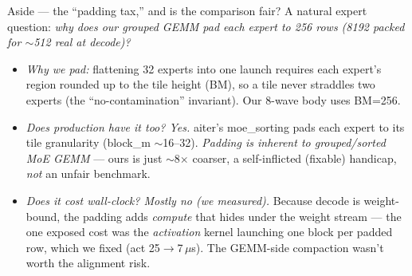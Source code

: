 \documentclass[pdf,aspectratio=169]{beamer}
\newcommand{\empy}[1]{{\color{darkorange}\emph{#1}}}
\newcommand{\empr}[1]{{\color{cardinalred}\emph{#1}}}
\newcommand{\mc}[1]{{\ttfamily\small #1}}
\begin{document}
\begin{frame}{Aside --- the ``padding tax,'' and is the comparison fair?}
\footnotesize
A natural expert question: \emph{why does our grouped GEMM pad each expert to 256 rows (8192 packed for $\sim$512 real at decode)?}
\begin{itemize}\footnotesize
  \item \empr{Why we pad:} flattening 32 experts into one launch requires each expert's region rounded up to the tile height (BM), so a tile never straddles two experts (the ``no-contamination'' invariant). Our 8-wave body uses BM=256.
  \item \empr{Does production have it too? Yes.} aiter's \mc{moe\_sorting} pads each expert to its tile granularity (\mc{block\_m} $\sim$16--32). \empy{Padding is inherent to grouped/sorted MoE GEMM} --- ours is just $\sim$8$\times$ coarser, a self-inflicted (fixable) handicap, \emph{not} an unfair benchmark.
  \item \empr{Does it cost wall-clock? Mostly no (we measured).} Because decode is weight-bound, the padding adds \emph{compute} that hides under the weight stream --- the one exposed cost was the \emph{activation} kernel launching one block per padded row, which we fixed (act 25$\to$7\,$\mu$s). The GEMM-side compaction wasn't worth the alignment risk.
\end{itemize}
\end{frame}
\end{document}
